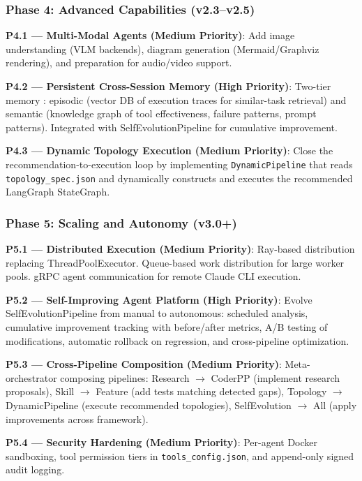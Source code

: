 \subsubsection{Phase 4: Advanced Capabilities (v2.3--v2.5)}

\textbf{P4.1 --- Multi-Modal Agents (Medium Priority)}: Add image understanding (VLM backends), diagram generation (Mermaid/Graphviz rendering), and preparation for audio/video support.

\textbf{P4.2 --- Persistent Cross-Session Memory (High Priority)}: Two-tier memory \cite{memevolve}: episodic (vector DB of execution traces for similar-task retrieval) and semantic (knowledge graph of tool effectiveness, failure patterns, prompt patterns). Integrated with SelfEvolutionPipeline for cumulative improvement.

\textbf{P4.3 --- Dynamic Topology Execution (Medium Priority)}: Close the recommendation-to-execution loop by implementing \texttt{DynamicPipeline} that reads \texttt{topology\_spec.json} and dynamically constructs and executes the recommended LangGraph StateGraph.

\subsubsection{Phase 5: Scaling and Autonomy (v3.0+)}

\textbf{P5.1 --- Distributed Execution (Medium Priority)}: Ray-based distribution replacing ThreadPoolExecutor. Queue-based work distribution for large worker pools. gRPC agent communication for remote Claude CLI execution.

\textbf{P5.2 --- Self-Improving Agent Platform (High Priority)}: Evolve SelfEvolutionPipeline from manual to autonomous: scheduled analysis, cumulative improvement tracking with before/after metrics, A/B testing of modifications, automatic rollback on regression, and cross-pipeline optimization.

\textbf{P5.3 --- Cross-Pipeline Composition (Medium Priority)}: Meta-orchestrator composing pipelines: Research $\rightarrow$ CoderPP (implement research proposals), Skill $\rightarrow$ Feature (add tests matching detected gaps), Topology $\rightarrow$ DynamicPipeline (execute recommended topologies), SelfEvolution $\rightarrow$ All (apply improvements across framework).

\textbf{P5.4 --- Security Hardening (Medium Priority)}: Per-agent Docker sandboxing, tool permission tiers in \texttt{tools\_config.json}, and append-only signed audit logging.
